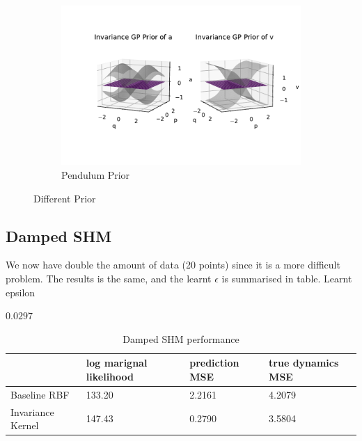 \documentclass{statsmsc}
\begin{document}
\begin{figure}[H]
\begin{subfigure}[b]{\linewidth}
         \includegraphics[width=\linewidth]{../codes/figures/prior_pendulum_invariance.pdf}
         \caption{Pendulum Prior}
         \label{fig:prior_pendulum_invariance}
     \end{subfigure}
        \caption{Different Prior}
        \label{fig:priors}
\end{figure}



\subsection{Damped SHM}
We now have double the amount of data (20 points) since it is a more difficult problem.
The results is the same, and the learnt $\epsilon$ is summarised in table. Learnt epsilon 

$0.0297$
\begin{table}[H]
  \centering
  \begin{tabular}{l l l l}
    \hline
                    & log marignal likelihood & prediction MSE  & true dynamics MSE\\
    \hline
Baseline RBF & 133.20 & 2.2161 & 4.2079 \\
Invariance Kernel & 147.43 & 0.2790 & 3.5804 \\
    \hline
  \end{tabular}
  \caption{Damped SHM performance }
  \label{tab:damped_shm_performance}
\end{table}
\end{document}
